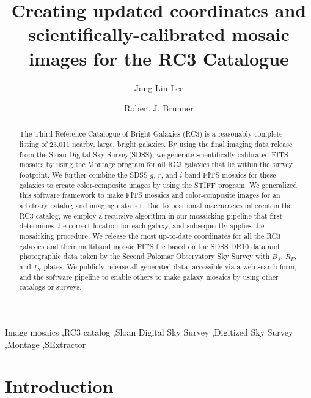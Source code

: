 \documentclass[authoryear, 12pt, 5p, times]{elsarticle}
\begin{document}
\begin{frontmatter}
\title{Creating updated coordinates and scientifically-calibrated mosaic images for the RC3 Catalogue}
\author[ucb]{Jung Lin Lee}
\author[ui]{Robert J. Brunner}
\address[ucb]{Astronomy Department, University of California at Berkeley, Berkeley, CA 94720-3411} 
\address[ui]{Department of Astronomy, University of Illinois, Urbana, IL 61801}

\begin{abstract}
The Third Reference Catalogue of Bright Galaxies (RC3) is a reasonably complete listing of 23,011 nearby, large, bright galaxies. By using the final imaging data release from the Sloan Digital Sky Survey(SDSS), we generate scientifically-calibrated FITS mosaics by using the Montage program for all RC3 galaxies that lie within the survey footprint. We further combine the SDSS $g$, $r$, and $i$ band FITS mosaics for these galaxies to create color-composite images by using the STIFF program. We generalized this software framework to make FITS mosaics and color-composite images for an arbitrary catalog and imaging data set. Due to positional inaccuracies inherent in the RC3 catalog, we employ a recursive algorithm in our mosaicking pipeline that first determines the correct location for each galaxy, and subsequently applies the mosaicking procedure. We release the most up-to-date coordinates for all the RC3 galaxies and their multiband mosaic FITS file based on the SDSS DR10 data and photographic data taken by the Second Palomar Observatory Sky Survey with $B_J$, $R_F$, and $I_N$ plates. We publicly release all generated data, accessible via a web search form, and the software pipeline to enable others to make  galaxy mosaics by using other catalogs or surveys.
\end{abstract}

\begin{keyword}
Image mosaics \sep RC3 catalog \sep Sloan Digital Sky Survey \sep Digitized Sky Survey \sep Montage \sep SExtractor
\end{keyword}

\end{frontmatter}

\section{Introduction}
\end{document}
